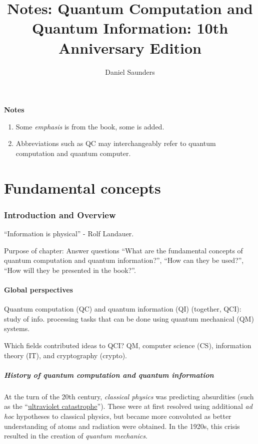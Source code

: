 \documentclass{article}
\title{Notes: Quantum Computation and Quantum Information: 10th Anniversary Edition}
\author{Daniel Saunders}
\numberwithin{equation}{section}
\begin{document}
\maketitle

\textbf{Notes}

\begin{enumerate}
	\item Some \textit{emphasis} is from the book, some is added.
	\item Abbreviations such as QC may interchangeably refer to quantum computation and quantum computer.
\end{enumerate}

\part{Fundamental concepts}

\section{Introduction and Overview}

``Information is physical'' - Rolf Landauer.

Purpose of chapter: Answer questions ``What are the fundamental concepts of quantum computation and quantum information?'', ``How can they be used?'', ``How will they be presented in the book?''.

\subsection{Global perspectives}

Quantum computation (QC) and quantum information (QI) (together, QCI): study of info. processing tasks that can be done using quantum mechanical (QM) systems.

Which fields contributed ideas to QCI? QM, computer science (CS), information theory (IT), and cryptography (crypto).

\subsubsection{History of quantum computation and quantum information}

At the turn of the 20th century, \textit{classical physics} was predicting absurdities (such as the ``\href{https://en.wikipedia.org/wiki/Ultraviolet_catastrophe}{ultraviolet catastrophe}''). These were at first resolved using additional \textit{ad hoc} hypotheses to classical physics, but became more convoluted as better understanding of atoms and radiation were obtained. In the 1920s, this crisis resulted in the creation of \textit{quantum mechanics}.
\end{document}
